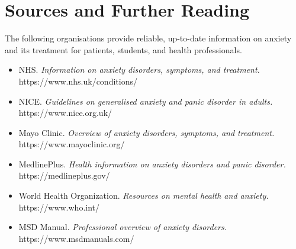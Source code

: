 \section*{Sources and Further Reading}
The following organisations provide reliable, up-to-date information on anxiety and its treatment for patients, students, and health professionals.

\begin{itemize}
    \item NHS. \textit{Information on anxiety disorders, symptoms, and treatment.} https://www.nhs.uk/conditions/
    \item NICE. \textit{Guidelines on generalised anxiety and panic disorder in adults.} https://www.nice.org.uk/
    \item Mayo Clinic. \textit{Overview of anxiety disorders, symptoms, and treatment.} https://www.mayoclinic.org/
    \item MedlinePlus. \textit{Health information on anxiety disorders and panic disorder.} https://medlineplus.gov/
    \item World Health Organization. \textit{Resources on mental health and anxiety.} https://www.who.int/
    \item MSD Manual. \textit{Professional overview of anxiety disorders.} https://www.msdmanuals.com/
\end{itemize}
